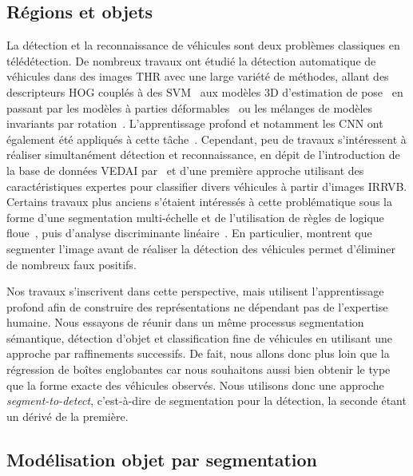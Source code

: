 \subsection{Régions et objets}

La détection et la reconnaissance de véhicules sont deux problèmes classiques en télédétection. De nombreux travaux ont étudié la détection automatique de véhicules dans des images \gls{THR} avec une large variété de méthodes, allant des descripteurs \gls{HOG} couplés à des \gls{SVM}~\cite{michel_local_2011,gleason_vehicle_2011,kamenetsky_aerial_2015} aux modèles 3D d'estimation de pose~\cite{janney_pose-invariant_2015} en passant par les modèles à parties déformables~\cite{randrianarivo_urban_2013} ou les mélanges de modèles invariants par rotation~\cite{randrianarivo_contextual_2016}. L'apprentissage profond et notamment les \gls{CNN} ont également été appliqués à cette tâche~\cite{chen_vehicle_2014}. Cependant, peu de travaux s'intéressent à réaliser simultanément détection et reconnaissance, en dépit de l'introduction de la base de données \gls{VEDAI} par~\citet{razakarivony_vehicle_2016} et d'une première approche utilisant des caractéristiques expertes pour classifier divers véhicules à partir d'images \gls{IRRVB}. Certains travaux plus anciens s'étaient intéressés à cette problématique sous la forme d'une segmentation multi-échelle et de l'utilisation de règles de logique floue~\cite{holt_object-based_2009}, puis d'analyse discriminante linéaire~\cite{eikvil_classification-based_2009}. En particulier, \citet{eikvil_classification-based_2009} montrent que segmenter l'image avant de réaliser la détection des véhicules permet d'éliminer de nombreux faux positifs.

Nos travaux s'inscrivent dans cette perspective, mais utilisent l'apprentissage profond afin de construire des représentations ne dépendant pas de l'expertise humaine. Nous essayons de réunir dans un même processus segmentation sémantique, détection d'objet et classification fine de véhicules en utilisant une approche par raffinements successifs. De fait, nous allons donc plus loin que la régression de boîtes englobantes car nous souhaitons aussi bien obtenir le type que la forme exacte des véhicules observés. Nous utilisons donc une approche \emph{segment-to-detect}, c'est-à-dire de segmentation pour la détection, la seconde étant un dérivé de la première.

\subsection{Modélisation objet par segmentation}

